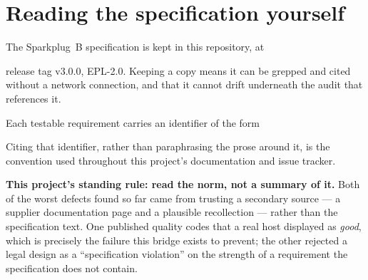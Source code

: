 \section{Reading the specification yourself}
\label{sec:sp-reading-the-norm}

The Sparkplug~B specification is kept in this repository, at

\begin{center}\end{center}

\noindent release tag v3.0.0, EPL-2.0. Keeping a copy means it can be grepped and cited
without a network connection, and that it cannot drift underneath the audit that
references it.

Each testable requirement carries an identifier of the form

\begin{center}\end{center}

\noindent Citing that identifier, rather than paraphrasing the prose around it, is the
convention used throughout this project's documentation and issue tracker.

\begin{warning}
\textbf{This project's standing rule: read the norm, not a summary of it.} Both of the
worst defects found so far came from trusting a secondary source --- a supplier
documentation page and a plausible recollection --- rather than the specification text.
One published quality codes that a real host displayed as \emph{good}, which is precisely
the failure this bridge exists to prevent; the other rejected a legal design as a
``specification violation'' on the strength of a requirement the specification does not
contain.
\end{warning}
